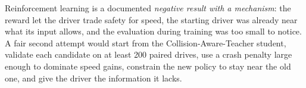 

\begin{implicationbox}
Reinforcement learning is a documented \emph{negative result with a mechanism}: the reward let the driver trade safety for speed, the starting driver was already near what its input allows, and the evaluation during training was too small to notice. A fair second attempt would start from the Collision-Aware-Teacher student, validate each candidate on at least 200 paired drives, use a crash penalty large enough to dominate speed gains, constrain the new policy to stay near the old one, and give the driver the information it lacks.
\end{implicationbox}

